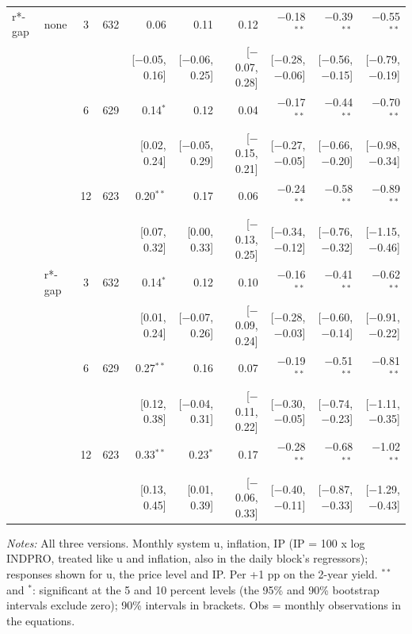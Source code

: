 \begin{longtable}{llcrrrrrrr}
\addlinespace
r*-gap & none & 3 & 632 & 0.06 & 0.11 & 0.12 & $-$0.18$^{**}$ & $-$0.39$^{**}$ & $-$0.55$^{**}$\\
 & & & & {\scriptsize [$-$0.05, 0.16]} & {\scriptsize [$-$0.06, 0.25]} & {\scriptsize [$-$0.07, 0.28]} & {\scriptsize [$-$0.28, $-$0.06]} & {\scriptsize [$-$0.56, $-$0.15]} & {\scriptsize [$-$0.79, $-$0.19]}\\
 &  & 6 & 629 & 0.14$^{*}$ & 0.12 & 0.04 & $-$0.17$^{**}$ & $-$0.44$^{**}$ & $-$0.70$^{**}$\\
 & & & & {\scriptsize [0.02, 0.24]} & {\scriptsize [$-$0.05, 0.29]} & {\scriptsize [$-$0.15, 0.21]} & {\scriptsize [$-$0.27, $-$0.05]} & {\scriptsize [$-$0.66, $-$0.20]} & {\scriptsize [$-$0.98, $-$0.34]}\\
 &  & 12 & 623 & 0.20$^{**}$ & 0.17 & 0.06 & $-$0.24$^{**}$ & $-$0.58$^{**}$ & $-$0.89$^{**}$\\
 & & & & {\scriptsize [0.07, 0.32]} & {\scriptsize [0.00, 0.33]} & {\scriptsize [$-$0.13, 0.25]} & {\scriptsize [$-$0.34, $-$0.12]} & {\scriptsize [$-$0.76, $-$0.32]} & {\scriptsize [$-$1.15, $-$0.46]}\\
 & r*-gap & 3 & 632 & 0.14$^{*}$ & 0.12 & 0.10 & $-$0.16$^{**}$ & $-$0.41$^{**}$ & $-$0.62$^{**}$\\
 & & & & {\scriptsize [0.01, 0.24]} & {\scriptsize [$-$0.07, 0.26]} & {\scriptsize [$-$0.09, 0.24]} & {\scriptsize [$-$0.28, $-$0.03]} & {\scriptsize [$-$0.60, $-$0.14]} & {\scriptsize [$-$0.91, $-$0.22]}\\
 &  & 6 & 629 & 0.27$^{**}$ & 0.16 & 0.07 & $-$0.19$^{**}$ & $-$0.51$^{**}$ & $-$0.81$^{**}$\\
 & & & & {\scriptsize [0.12, 0.38]} & {\scriptsize [$-$0.04, 0.31]} & {\scriptsize [$-$0.11, 0.22]} & {\scriptsize [$-$0.30, $-$0.05]} & {\scriptsize [$-$0.74, $-$0.23]} & {\scriptsize [$-$1.11, $-$0.35]}\\
 &  & 12 & 623 & 0.33$^{**}$ & 0.23$^{*}$ & 0.17 & $-$0.28$^{**}$ & $-$0.68$^{**}$ & $-$1.02$^{**}$\\
 & & & & {\scriptsize [0.13, 0.45]} & {\scriptsize [0.01, 0.39]} & {\scriptsize [$-$0.06, 0.33]} & {\scriptsize [$-$0.40, $-$0.11]} & {\scriptsize [$-$0.87, $-$0.33]} & {\scriptsize [$-$1.29, $-$0.43]}\\
\end{longtable}
\begin{flushleft}\footnotesize\textit{Notes:} All three versions. Monthly system u, inflation, IP (IP = 100 x log INDPRO, treated like u and inflation, also in the daily block's regressors); responses shown for u, the price level and IP. Per +1 pp on the 2-year yield. $^{**}$ and $^{*}$: significant at the 5 and 10 percent levels (the 95\% and 90\% bootstrap intervals exclude zero); 90\% intervals in brackets. Obs = monthly observations in the equations.\end{flushleft}
\endgroup
